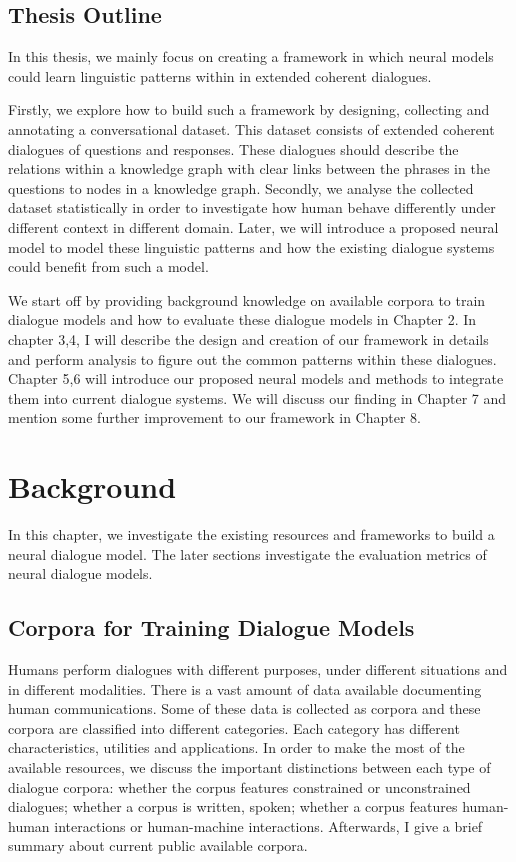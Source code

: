\documentclass[bsc,frontabs,twoside,singlespacing,parskip,deptreport]{infthesis}     %
\begin{document}
\section {Thesis Outline}

In this thesis, we mainly focus on creating a framework in which neural models could learn linguistic patterns within in extended coherent dialogues.

Firstly, we explore how to build such a framework by designing, collecting and annotating a conversational dataset. This dataset consists of extended coherent dialogues of questions and responses. These dialogues should describe the relations within a knowledge graph with clear links between the phrases in the questions to nodes in a knowledge graph. Secondly, we analyse the collected dataset statistically in order to investigate how human behave differently under different context in different domain. Later, we will introduce a proposed neural model to model these linguistic patterns and how the existing dialogue systems could benefit from such a model.

We start off by providing background knowledge on available corpora to train dialogue models and how to evaluate these dialogue models in Chapter 2. In chapter 3,4, I will describe the design and creation of our framework in details and perform analysis to figure out the common patterns within these dialogues. Chapter 5,6 will introduce our proposed neural models and methods to integrate them into current dialogue systems. We will discuss our finding in Chapter 7 and mention some further improvement to our framework in Chapter 8.

\chapter{Background}

In this chapter, we investigate the existing resources and frameworks to build a neural dialogue model. The later sections investigate the evaluation metrics of neural dialogue models.

\section{Corpora for Training Dialogue Models}

Humans perform dialogues with different purposes, under different situations and in different modalities. There is a vast amount of data available documenting human communications. Some of these data is collected as corpora and these corpora are classified into different categories. Each category has different characteristics, utilities and applications. In order to make the most of the available resources, we discuss the important distinctions between each type of dialogue corpora: whether the corpus features constrained or unconstrained dialogues; whether a corpus is written, spoken; whether a corpus features human-human interactions or human-machine interactions. Afterwards, I give a brief summary about current public available corpora.
\end{document}
